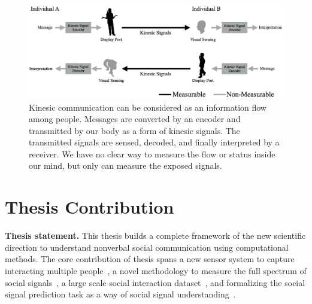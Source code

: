 


\begin{figure}[t]
	\centering
	\includegraphics[trim=0 0 0 0, clip=true, width=\textwidth]{figures/kinesicflow2}
	\caption{Kinesic communication can be considered as an information flow among people. Messages are converted by an encoder and transmitted by our body as a form of kinesic signals. The transmitted signals are sensed, decoded, and finally interpreted by a receiver. We have no clear way to measure the flow or status inside our mind, but only can measure the exposed signals.}	
	\label{fig:kinesicflow}
\end{figure}


\section{Thesis Contribution}

\noindent \textbf{Thesis statement.}
This thesis builds a complete framework of the new scientific direction to understand nonverbal social communication using computational methods. The core contribution of thesis spans a new sensor system to capture interacting multiple people~\cite{Joo-15,joo2017panoptic}, a novel methodology to measure the full spectrum of social signals~\cite{Joo2014,Joo-15,joo2017panoptic,simon2017hand,joo2018}, a large scale social interaction dataset~\cite{joo2017panoptic,joo2019}, and formalizing the social signal prediction task as a way of social signal understanding~\cite{joo2019}.


